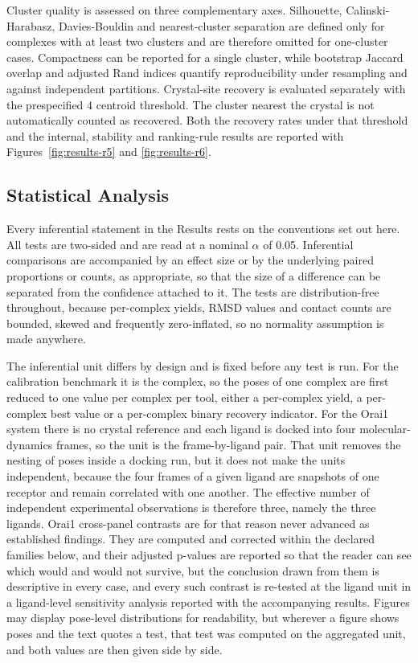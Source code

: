 Cluster quality is assessed on three complementary axes. Silhouette, Calinski-Harabasz, Davies-Bouldin and nearest-cluster separation are defined only for complexes with at least two clusters and are therefore omitted for one-cluster cases. Compactness can be reported for a single cluster, while bootstrap Jaccard overlap and adjusted Rand indices quantify reproducibility under resampling and against independent partitions. Crystal-site recovery is evaluated separately with the prespecified 4 \angstrom{} centroid threshold. The cluster nearest the crystal is not automatically counted as recovered. Both the recovery rates under that threshold and the internal, stability and ranking-rule results are reported with Figures~\ref{fig:results-r5} and \ref{fig:results-r6}.

\hypertarget{statistical-analysis}{%
\subsection{Statistical Analysis}\label{statistical-analysis}}

Every inferential statement in the Results rests on the conventions set out here. All tests are two-sided and are read at a nominal \ensuremath{\alpha} of 0.05. Inferential comparisons are accompanied by an effect size or by the underlying paired proportions or counts, as appropriate, so that the size of a difference can be separated from the confidence attached to it. The tests are distribution-free throughout, because per-complex yields, RMSD values and contact counts are bounded, skewed and frequently zero-inflated, so no normality assumption is made anywhere.

The inferential unit differs by design and is fixed before any test is run. For the calibration benchmark it is the complex, so the poses of one complex are first reduced to one value per complex per tool, either a per-complex yield, a per-complex best value or a per-complex binary recovery indicator. For the Orai1 system there is no crystal reference and each ligand is docked into four molecular-dynamics frames, so the unit is the frame-by-ligand pair. That unit removes the nesting of poses inside a docking run, but it does not make the units independent, because the four frames of a given ligand are snapshots of one receptor and remain correlated with one another. The effective number of independent experimental observations is therefore three, namely the three ligands. Orai1 cross-panel contrasts are for that reason never advanced as established findings. They are computed and corrected within the declared families below, and their adjusted p-values are reported so that the reader can see which would and would not survive, but the conclusion drawn from them is descriptive in every case, and every such contrast is re-tested at the ligand unit in a ligand-level sensitivity analysis reported with the accompanying results. Figures may display pose-level distributions for readability, but wherever a figure shows poses and the text quotes a test, that test was computed on the aggregated unit, and both values are then given side by side.

